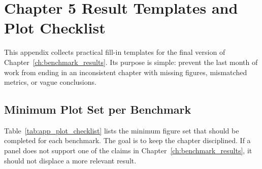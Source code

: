 \chapter[Chapter 5 Result Templates]{Chapter 5 Result Templates and Plot Checklist}
\label{app:chapter5_templates}

\providecommand{\resultplaceholder}[1]{%
	\fbox{\parbox[c][0.18\textheight][c]{0.88\linewidth}{\centering \textbf{Placeholder}\\[0.5em]#1}}%
}

This appendix collects practical fill-in templates for the final version of Chapter~\ref{ch:benchmark_results}. Its purpose is simple: prevent the last month of work from ending in an inconsistent chapter with missing figures, mismatched metrics, or vague conclusions.

\section{Minimum Plot Set per Benchmark}
Table~\ref{tab:app_plot_checklist} lists the minimum figure set that should be completed for each benchmark. The goal is to keep the chapter disciplined. If a panel does not support one of the claims in Chapter~\ref{ch:benchmark_results}, it should not displace a more relevant result.

